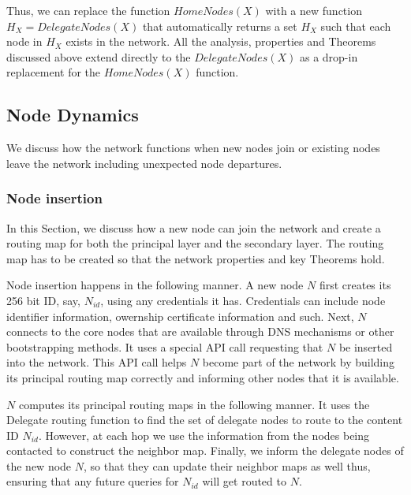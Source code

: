 Thus, we can replace the function \(HomeNodes(X)\) with a new function \(H_X = DelegateNodes(X)\) that automatically returns a
set \(H_X\) such that each node in \(H_X\) exists in the network. All the analysis, properties and Theorems discussed
above extend directly to the \(DelegateNodes(X)\) as a drop-in replacement for the \(HomeNodes(X)\) function.


\subsection{Node Dynamics}
\label{net:node_dynamics}

We discuss how the network functions when new nodes join or existing nodes leave the network including unexpected node
departures.

\subsubsection{Node insertion}

In this Section, we discuss how a new node can join the network and create a routing map for both the principal layer
and the secondary layer. The routing map has to be created so that the network properties and key Theorems hold.

Node insertion happens in the following manner. A new node \(N\) first creates its 256 bit ID,
say, \(N_{id}\), using any credentials it has. Credentials can include node identifier information, owernship
certificate information and such. Next, \( N \) connects to the core nodes that are available through DNS mechanisms or
other bootstrapping methods. It uses a special API call requesting that \(N\) be inserted into the network. This API
call helps \(N\) become part of the network by building its principal routing map correctly and informing other nodes
that it is available.

\(N\) computes its principal routing maps in the following manner. It uses the Delegate routing function to find the set of delegate
nodes to route to the content ID \(N_{id}\). However, at each hop we use the information from the nodes being contacted
to construct the neighbor map.  Finally, we inform the delegate nodes of the new node \(N\), so that they can update
their neighbor maps as well thus, ensuring that any future queries for \(N_{id}\) will get routed to \(N\). 

